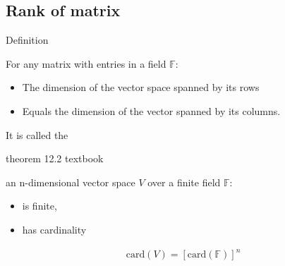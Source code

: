 \subsection{Rank of matrix}
\begin{parag}{Definition}
   \begin{definition}
    For any matrix with entries in a field $\mathbb{F}$:
    \begin{itemize}
    \item The dimension of the vector space spanned by its rows
    \item  Equals the dimension of the vector spanned by its columns.
    \end{itemize}
    It is called the 
   \end{definition} 
\end{parag}

\begin{parag}{theorem 12.2 textbook}
    \begin{theoreme}
    an n-dimensional vector space $V$ over a finite field $\mathbb{F}$:
    \begin{itemize}
        \item is finite,
        \item has cardinality
    \end{itemize}
    \begin{align*} \text{card}\left(V\right) =  \left[\text{card}\left(\mathbb{F}\right)\right]^n \end{align*}
    
    \end{theoreme}
\end{parag}








